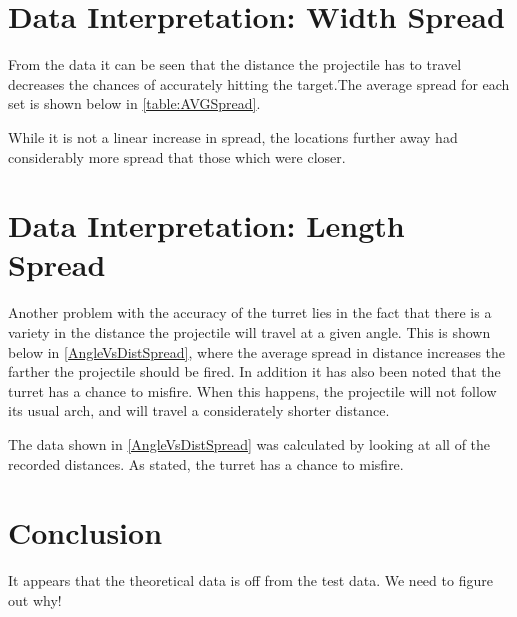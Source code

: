 \section{Data Interpretation: Width Spread}
From the data it can be seen that the distance the projectile has to travel
decreases the chances of accurately hitting the target.The average spread for
each set is shown below in \autoref{table:AVGSpread}.


While it is not a linear increase in spread, the locations further away had
considerably more spread that those which were closer. 

\section{Data Interpretation: Length Spread}
Another problem with the accuracy of the turret lies in the fact that there is a
variety in the distance the projectile will travel at a given angle. This is shown below in
\autoref{AngleVsDistSpread}, where the average spread in distance increases the
farther the projectile should be fired. In addition it has also been noted that
the turret has a chance to misfire. When this happens, the projectile will not
follow its usual arch, and will travel a considerately shorter distance.


The data shown in \autoref{AngleVsDistSpread} was calculated by looking at all
of the recorded distances.
As stated, the turret has a chance to misfire. 


\section{Conclusion}
It appears that the theoretical data is off from the test data. We need to
figure out why!
